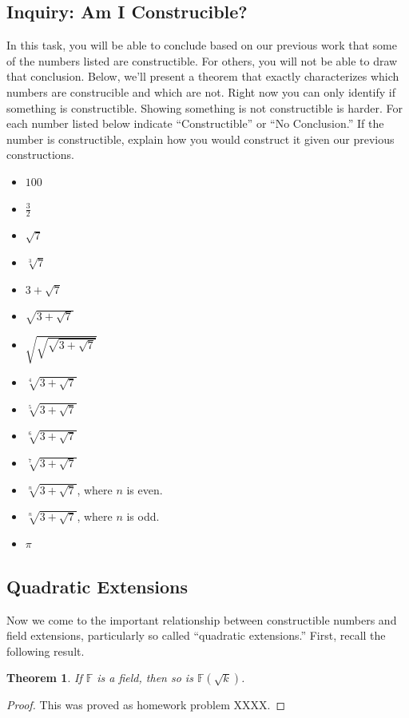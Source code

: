 \documentclass[11pt]{article}
\newenvironment{task}
	{\begin{mdframed}[linecolor=lightgray, linewidth=3pt]\raggedright}
	{\end{mdframed}}
\newtheorem{theorem}{Theorem}[section]
\theoremstyle{definition}
\begin{document}
\subsection{Inquiry: Am I Construcible?}
\begin{task}
  In this task, you will be able to conclude based on our previous work that some of the numbers listed are constructible. For others, you will not 
  be able to draw that conclusion. Below, we'll present a theorem that exactly characterizes which numbers are construcible and which are not. Right now
  you can only identify if something is constructible. Showing something is not constructible is harder. For each number listed below indicate ``Constructible''
  or ``No Conclusion.'' If the number is constructible, explain how you would construct it given our previous constructions.
  \begin{itemize}
    \item $100$
    \item $\frac{3}{2}$
    \item $\sqrt{7}$
    \item $\sqrt[3]{7}$
    \item $3 + \sqrt{7}$
    \item $\sqrt{3 + \sqrt{7}}$
    \item $\sqrt{\sqrt{\sqrt{3+\sqrt{7}}}}$
    \item $\sqrt[4]{3 + \sqrt{7}}$
    \item $\sqrt[5]{3 + \sqrt{7}}$
    \item $\sqrt[6]{3 + \sqrt{7}}$
    \item $\sqrt[7]{3 + \sqrt{7}}$
    \item $\sqrt[n]{3 + \sqrt{7}}$, where $n$ is even.
    \item $\sqrt[n]{3 + \sqrt{7}}$, where $n$ is odd.
    \item $\pi$
  \end{itemize}
\end{task}

\subsection{Quadratic Extensions}

Now we come to the important relationship between constructible numbers and field extensions, particularly so called ``quadratic extensions.'' First, recall
the following result.

\begin{theorem}
  If $\mathbb{F}$ is a field, then so is $\mathbb{F}(\sqrt{k})$.
  \label{theorem: quadratic extensions of fields are fields}
\end{theorem}
\begin{proof}
  This was proved as homework problem XXXX.
\end{proof}
\end{document}
